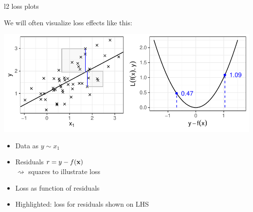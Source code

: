 \documentclass[11pt,compress,t,notes=noshow, xcolor=table]{beamer}
\begin{document}
\begin{vbframe}{l2 loss plots}

We will often visualize loss effects like this:

\vfill

\includegraphics[width=\textwidth]{figure/reg_l2_lossplot_quad.pdf}

\hspace{0.5cm}
\begin{minipage}[t]{0.45\textwidth}
    \footnotesize
    \begin{itemize}
        \item Data as $y \sim x_1$
        \item Residuals \textcolor{blue}{$r = y - f(\mathbf{x})$}
        \\$\rightsquigarrow$ squares to illustrate loss
    \end{itemize}
\end{minipage}
\hfill
\begin{minipage}[t]{0.4\textwidth}
    \footnotesize
    \begin{itemize}
        \item Loss as function of residuals
        \item Highlighted: loss for residuals shown on LHS
    \end{itemize}
\end{minipage}

\end{vbframe}

\end{document}
